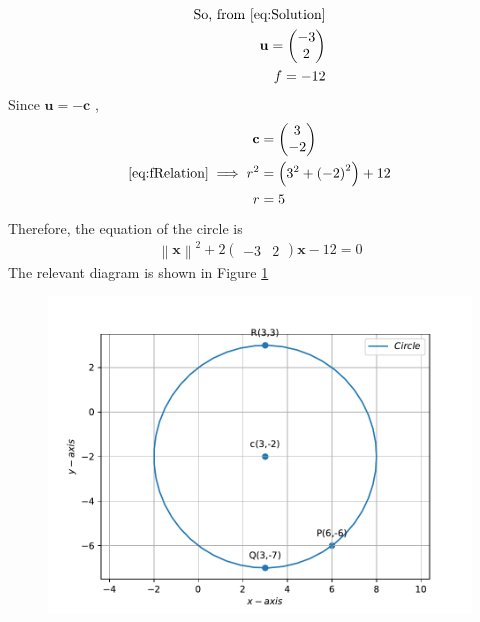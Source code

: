 \documentclass[12pt]{article}
\providecommand{\brak}[1]{\ensuremath{\left(#1\right)}}
\newcommand{\myvec}[1]{\ensuremath{\begin{pmatrix}#1\end{pmatrix}}}
\let\vec\mathbf
\providecommand{\norm}[1]{\left\lVert#1\right\rVert}
\let\vec\mathbf
\begin{document}
\begin{enumerate}
\begin{align}
	\text{So, from } \eqref{eq:Solution} \\
	\vec{u} = \myvec{-3 \\ 2} \\ 
	f = -12 
\end{align}
Since $\vec{u} = -\vec{c}$ , 
\begin{align}
	\vec{c} &= \myvec{ 3 \\ -2} \\
	\eqref{eq:fRelation} \implies r^2 &= \brak{3^2 + \brak{-2}^2} + 12 \\
	 r &= 5
\end{align}
Therefore, the equation of the circle is 
\begin{align}
	\norm{\vec{x}}^2 + 2\myvec{-3 & 2}\vec{x} - 12 = 0 
\end{align}
The relevant diagram is shown in Figure \ref{fig:Fig1}
\begin{figure}[!h]
	\begin{center}
		\includegraphics[width=\columnwidth]{./figs/problem3.pdf}
	\end{center}
\caption{}
\label{fig:Fig1}
\end{figure}
\end{enumerate}
\end{document}

